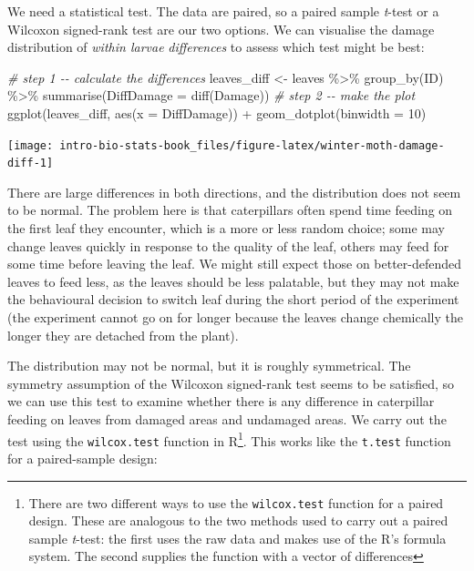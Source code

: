 \documentclass[
]{book}
\newenvironment{Shaded}{\begin{snugshade}}{\end{snugshade}}
\newcommand{\AttributeTok}[1]{\textcolor[rgb]{0.77,0.63,0.00}{#1}}
\newcommand{\CommentTok}[1]{\textcolor[rgb]{0.56,0.35,0.01}{\textit{#1}}}
\newcommand{\DecValTok}[1]{\textcolor[rgb]{0.00,0.00,0.81}{#1}}
\newcommand{\FunctionTok}[1]{\textcolor[rgb]{0.00,0.00,0.00}{#1}}
\newcommand{\NormalTok}[1]{#1}
\newcommand{\OtherTok}[1]{\textcolor[rgb]{0.56,0.35,0.01}{#1}}
\newcommand{\SpecialCharTok}[1]{\textcolor[rgb]{0.00,0.00,0.00}{#1}}
\begin{document}
We need a statistical test. The data are paired, so a paired sample \emph{t}-test or a Wilcoxon signed-rank test are our two options. We can visualise the damage distribution of \emph{within larvae} \emph{differences} to assess which test might be best:

\begin{Shaded}
\begin{Highlighting}[]
\CommentTok{\# step 1 {-}{-} calculate the differences}
\NormalTok{leaves\_diff }\OtherTok{\textless{}{-}} 
\NormalTok{  leaves }\SpecialCharTok{\%\textgreater{}\%} 
  \FunctionTok{group\_by}\NormalTok{(ID) }\SpecialCharTok{\%\textgreater{}\%} 
  \FunctionTok{summarise}\NormalTok{(}\AttributeTok{DiffDamage =} \FunctionTok{diff}\NormalTok{(Damage))}
\CommentTok{\# step 2 {-}{-} make the plot}
\FunctionTok{ggplot}\NormalTok{(leaves\_diff, }\FunctionTok{aes}\NormalTok{(}\AttributeTok{x =}\NormalTok{ DiffDamage)) }\SpecialCharTok{+} 
  \FunctionTok{geom\_dotplot}\NormalTok{(}\AttributeTok{binwidth =} \DecValTok{10}\NormalTok{)}
\end{Highlighting}
\end{Shaded}

\begin{center}\texttt{[image: intro-bio-stats-book\_files/figure-latex/winter-moth-damage-diff-1]} \end{center}

There are large differences in both directions, and the distribution does not seem to be normal. The problem here is that caterpillars often spend time feeding on the first leaf they encounter, which is a more or less random choice; some may change leaves quickly in response to the quality of the leaf, others may feed for some time before leaving the leaf. We might still expect those on better-defended leaves to feed less, as the leaves should be less palatable, but they may not make the behavioural decision to switch leaf during the short period of the experiment (the experiment cannot go on for longer because the leaves change chemically the longer they are detached from the plant).

The distribution may not be normal, but it is roughly symmetrical. The symmetry assumption of the Wilcoxon signed-rank test seems to be satisfied, so we can use this test to examine whether there is any difference in caterpillar feeding on leaves from damaged areas and undamaged areas. We carry out the test using the \texttt{wilcox.test} function in R\footnote{There are two different ways to use the \texttt{wilcox.test} function for a paired design. These are analogous to the two methods used to carry out a paired sample \emph{t}-test: the first uses the raw data and makes use of the R's formula system. The second supplies the function with a vector of differences}. This works like the \texttt{t.test} function for a paired-sample design:
\end{document}
